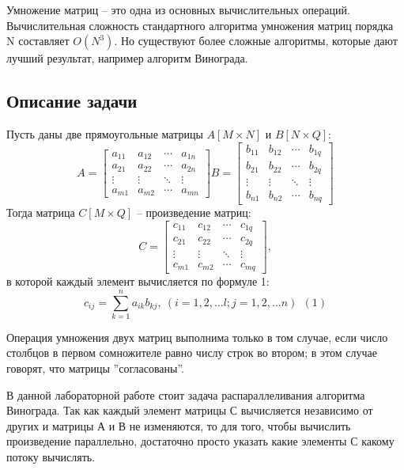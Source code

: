 \documentclass[a4paper,14pt]{article} %
\begin{document}
        Умножение матриц – это одна из основных вычислительных операций. Вычислительная сложность стандартного алгоритма умножения матриц порядка N составляет $O(N^3)$. Но существуют более сложные алгоритмы, которые дают лучший результат, например алгоритм Винограда. 
        
        
        \subsection{Описание задачи}
        \hfill
        
	Пусть даны две прямоугольные матрицы $A[M \times N]$ и $B[N \times Q]$:
	$$
	A = 
  	\begin{bmatrix} 
   		a_{11} & a_{12} & \cdots & a_{1n} \\
    		a_{21} & a_{22} & \cdots & a_{2n} \\ 
   		\vdots & \vdots & \ddots & \vdots \\ 
		a_{m1} & a_{m2} & \cdots & a_{mn}
	\end{bmatrix}
	B =   
	\begin{bmatrix} 
		b_{11} & b_{12} & \cdots & b_{1q} \\
		b_{21} & b_{22} & \cdots & b_{2q} \\ 
		\vdots & \vdots & \ddots & \vdots \\ 
    		b_{n1} & b_{n2} & \cdots & b_{nq}
  	\end{bmatrix}
	$$
	Тогда матрица $C[M \times Q]$ -- произведение матриц:
	$$
	C = 
	\begin{bmatrix} 
    		c_{11} & c_{12} & \cdots & c_{1q} \\
   		c_{21} & c_{22} & \cdots & c_{2q} \\ 
   		\vdots & \vdots & \ddots & \vdots \\ 
    		c_{m1} & c_{m2} & \cdots & c_{mq}
  	\end{bmatrix},
	$$
	в которой каждый элемент вычисляется по формуле 1: 
	$$c_{ij} = \sum_{k=1}^n a_{ik}b_{kj}, ~(i=1, 2, \ldots l;j=1, 2, \ldots n)~~(1)$$
	
	Операция умножения двух матриц выполнима только в том случае, если число столбцов в первом сомножителе равно числу строк во втором; в этом случае говорят, что матрицы ''согласованы''.
	
	В данной лабораторной работе стоит задача распараллеливания алгоритма Винограда. Так как каждый элемент матрицы С вычисляется независимо от других и матрицы А и В не изменяются, то для того, чтобы вычислить произведение параллельно, достаточно просто указать какие элементы С какому потоку вычислять.
	
\end{document}
